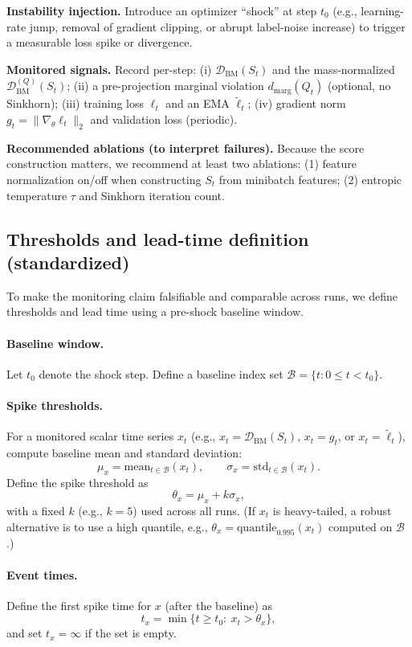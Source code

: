 \documentclass[11pt]{article}
\begin{document}
\textbf{Instability injection.}
Introduce an optimizer ``shock'' at step $t_0$ (e.g., learning-rate jump, removal of gradient clipping, or abrupt label-noise increase) to trigger a measurable loss spike or divergence.

\textbf{Monitored signals.}
Record per-step:
(i) $\mathcal{D}_{\text{BM}}(S_t)$ and the mass-normalized $\mathcal{D}_{\text{BM}}^{(Q)}(S_t)$;
(ii) a pre-projection marginal violation $d_{\text{marg}}(Q_t)$ (optional, no Sinkhorn);
(iii) training loss $\ell_t$ and an EMA $\tilde{\ell}_t$;
(iv) gradient norm $g_t=\|\nabla_\theta \ell_t\|_2$ and validation loss (periodic).

\textbf{Recommended ablations (to interpret failures).}
Because the score construction matters, we recommend at least two ablations:
(1) feature normalization on/off when constructing $S_t$ from minibatch features;
(2) entropic temperature $\tau$ and Sinkhorn iteration count.

\subsection{Thresholds and lead-time definition (standardized)}
To make the monitoring claim falsifiable and comparable across runs, we define thresholds and lead time using a pre-shock baseline window.

\paragraph{Baseline window.}
Let $t_0$ denote the shock step. Define a baseline index set $\mathcal{B}=\{t: 0\le t < t_0\}$.

\paragraph{Spike thresholds.}
For a monitored scalar time series $x_t$ (e.g., $x_t=\mathcal{D}_{\text{BM}}(S_t)$, $x_t=g_t$, or $x_t=\tilde{\ell}_t$), compute baseline mean and standard deviation:
\[
\mu_x=\mathrm{mean}_{t\in\mathcal{B}}(x_t),\qquad
\sigma_x=\mathrm{std}_{t\in\mathcal{B}}(x_t).
\]
Define the spike threshold as
\[
\theta_x = \mu_x + k\sigma_x,
\]
with a fixed $k$ (e.g., $k=5$) used across all runs. (If $x_t$ is heavy-tailed, a robust alternative is to use a high quantile, e.g., $\theta_x=\mathrm{quantile}_{0.995}(x_t)$ computed on $\mathcal{B}$.)

\paragraph{Event times.}
Define the first spike time for $x$ (after the baseline) as
\[
t_x = \min\{t\ge t_0:\ x_t > \theta_x\},
\]
and set $t_x=\infty$ if the set is empty.
\end{document}

